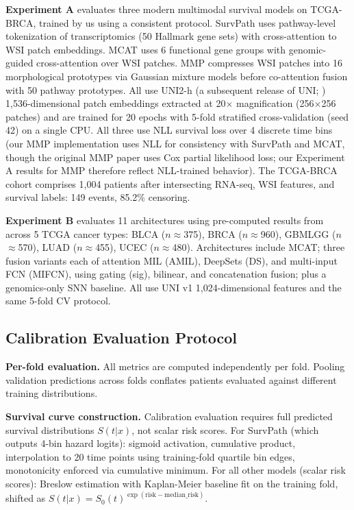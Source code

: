 \documentclass[pmlr]{jmlr}
\begin{document}
\textbf{Experiment A} evaluates three modern multimodal survival models on TCGA-BRCA, trained by us using a consistent protocol. SurvPath uses pathway-level tokenization of transcriptomics (50 Hallmark gene sets) with cross-attention to WSI patch embeddings. MCAT uses 6 functional gene groups with genomic-guided cross-attention over WSI patches. MMP compresses WSI patches into 16 morphological prototypes via Gaussian mixture models before co-attention fusion with 50 pathway prototypes. All use UNI2-h (a subsequent release of UNI; \citealp{chen2024uni}) 1,536-dimensional patch embeddings extracted at 20$\times$ magnification (256$\times$256 patches) and are trained for 20 epochs with 5-fold stratified cross-validation (seed 42) on a single CPU. All three use NLL survival loss over 4 discrete time bins (our MMP implementation uses NLL for consistency with SurvPath and MCAT, though the original MMP paper \citep{song2024multimodal} uses Cox partial likelihood loss; our Experiment A results for MMP therefore reflect NLL-trained behavior). The TCGA-BRCA cohort comprises 1,004 patients after intersecting RNA-seq, WSI features, and survival labels: 149 events, 85.2\% censoring.

\textbf{Experiment B} evaluates 11 architectures using pre-computed results from \citet{chen2021multimodal} across 5 TCGA cancer types: BLCA ($n$$\approx$375), BRCA ($n$$\approx$960), GBMLGG ($n$$\approx$570), LUAD ($n$$\approx$455), UCEC ($n$$\approx$480). Architectures include MCAT; three fusion variants each of attention MIL (AMIL), DeepSets (DS), and multi-input FCN (MIFCN), using gating (sig), bilinear, and concatenation fusion; plus a genomics-only SNN baseline. All use UNI v1 1,024-dimensional features and the same 5-fold CV protocol.

\subsection{Calibration Evaluation Protocol}

\textbf{Per-fold evaluation.} All metrics are computed independently per fold. Pooling validation predictions across folds conflates patients evaluated against different training distributions.

\textbf{Survival curve construction.} Calibration evaluation requires full predicted survival distributions $S(t|x)$, not scalar risk scores. For SurvPath (which outputs 4-bin hazard logits): sigmoid activation, cumulative product, interpolation to 20 time points using training-fold quartile bin edges, monotonicity enforced via cumulative minimum. For all other models (scalar risk scores): Breslow estimation with Kaplan-Meier baseline fit on the training fold, shifted as $S(t|x) = S_0(t)^{\exp(\text{risk} - \text{median\_risk})}$.
\end{document}
